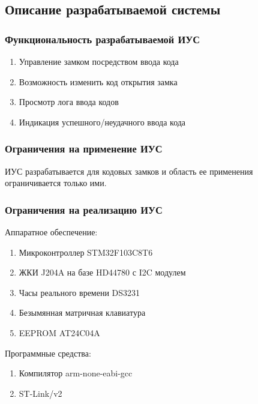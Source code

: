 \documentclass[12pt, a4paper] {article}
\begin{document}
\subsection{Описание разрабатываемой системы}
\subsubsection*{Функциональность разрабатываемой ИУС}
\begin{enumerate}
  \item Управление замком посредством ввода кода
  \item Возможность изменить код открытия замка
  \item Просмотр лога ввода кодов
  \item Индикация успешного/неудачного ввода кода
\end{enumerate}
\subsubsection*{Ограничения на применение ИУС}
ИУС разрабатывается для кодовых замков и область ее применения
ограничивается только ими.
\subsubsection*{Ограничения на реализацию ИУС}
Аппаратное обеспечение:
\begin{enumerate}
  \item Микроконтроллер STM32F103C8T6
  \item ЖКИ J204A на базе HD44780 с I2C модулем 
  \item Часы реального времени DS3231
  \item Безымянная матричная клавиатура
  \item EEPROM AT24C04A
\end{enumerate}
Программные средства:
\begin{enumerate}
  \item Компилятор arm-none-eabi-gcc
  \item ST-Link/v2
\end{enumerate}
\end{document}

